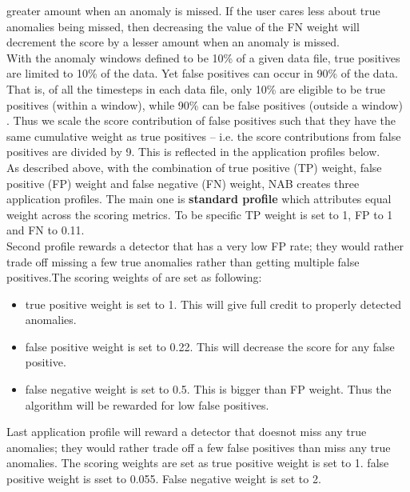 \documentclass[12pt]{article}
\begin{document}
greater amount when an anomaly is missed. If the user cares less about true
anomalies being missed, then decreasing the value of the FN weight will
decrement the score by a lesser amount when an anomaly is missed.\\
\break
With the anomaly windows defined to be 10\% of a given data file, true positives are limited to 10\% of the data. Yet false positives can
occur in 90\% of the data. That is, of all the timesteps in each data file, only 10\%
are eligible to be true positives (within a window), while 90\% can be false
positives (outside a window) . Thus we scale the score contribution of false
positives such that they have the same cumulative weight as true positives – i.e.
the score contributions from false positives are divided by 9. This is reflected in
the application profiles below.\\
\break
As described above, with the combination of true positive (TP) weight, false positive (FP) weight and false negative (FN) weight, NAB creates three application profiles. The main one is \textbf{standard profile} which attributes equal weight
across the scoring metrics. To be specific TP weight is set to 1, FP to 1 and FN to 0.11. \\
\break
Second profile rewards a detector that has a
very low FP rate; they would rather trade off missing a few true anomalies rather
than getting multiple false positives.The scoring weights of are set as following:
\begin{itemize}
\item true positive weight is set to 1. This will give full credit to properly detected anomalies. 
\item false positive weight is set to 0.22. This will decrease the score for any false positive.
\item false negative weight is set to 0.5. This is bigger than FP weight. Thus the algorithm will be rewarded for low false positives.
\end{itemize}
Last application profile will reward a detector that doesnot
miss any true anomalies; they would rather trade off a few false positives than
miss any true anomalies. The scoring weights are set as true positive weight is set to 1. false positive weight is sset to 0.055. False negative weight is set to 2.\\
\break
\end{document}
